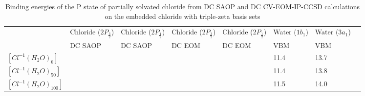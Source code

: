 \documentclass[a4paper,11pt]{report}
\begin{document}
\begin{table}[H]\small
\begin{center}
\caption{Binding energies of the P state of partially solvated chloride from DC SAOP and DC CV-EOM-IP-CCSD calculations on the embedded chloride with triple-zeta basis sets} \label{tab:1}
\begin{tabular}{|l|l|l|l|l|l|l|l|}
\hline
&Chloride ($2P_{\frac{3}{2}}$)&Chloride ($2P_{\frac{1}{2}}$)&Chloride ($2P_{\frac{3}{2}}$)&Chloride ($2P_{\frac{1}{2}}$)&Water ($1b_{1}$)&Water ($3a_{1}$)\\
&\hspace*{0.5cm} DC SAOP &\hspace*{0.5cm} DC SAOP&DC EOM&DC EOM&\hspace*{0.5cm}VBM &\hspace*{0.5cm}VBM\\ 
\hline
$[Cl^{-1}(H_{2}O)_{6}]$&\hspace*{0.5cm}&\hspace*{0.5cm}&&&\hspace*{0.5cm}11.4&\hspace*{0.5cm}13.7\\
\hline
$[Cl^{-1}(H_{2}O)_{50}]$&\hspace*{0.5cm}&\hspace*{0.5cm}&&&\hspace*{0.5cm}11.4&\hspace*{0.5cm}13.8\\
\hline
$[Cl^{-1}(H_{2}O)_{100}]$&\hspace*{0.5cm}&\hspace*{0.5cm}&&&\hspace*{0.5cm}11.5&\hspace*{0.5cm}14.0\\
\hline
\end{tabular}
\label{table1m}
\end{center}
\end{table}
\end{document}
